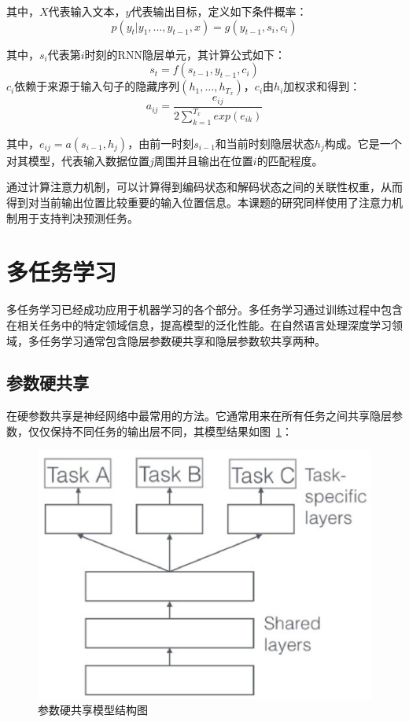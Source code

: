 其中，$X$代表输入文本，$y$代表输出目标，定义如下条件概率：
\begin{equation}
    p(y_t|y_1, \dots, y_{t-1},x) = g(y_{t-1},s_i,c_i)
\end{equation}

其中，$s_i$代表第$i$时刻的RNN隐层单元，其计算公式如下：
\begin{equation}
    s_t= f(s_{t-1},y_{t-1},c_i)
\end{equation}
$c_i$依赖于来源于输入句子的隐藏序列$(h_1,\dots,h_{T_x})$，$c_i$由$h_i$加权求和得到：
\begin{equation}
a_{ij} = \frac{e_{ij}}{2\sum_{k=1}^{T_x}exp(e_{ik})}
\end{equation}

其中，$e_{ij}=a(s_{i-1},h_j)$，由前一时刻$s_{i-1}$和当前时刻隐层状态$h_j$构成。它是一个对其模型，代表输入数据位置$j$周围并且输出在位置$i$的匹配程度。

通过计算注意力机制，可以计算得到编码状态和解码状态之间的关联性权重，从而得到对当前输出位置比较重要的输入位置信息。本课题的研究同样使用了注意力机制用于支持判决预测任务。

\section{多任务学习}

多任务学习已经成功应用于机器学习的各个部分。多任务学习通过训练过程中包含在相关任务中的特定领域信息，提高模型的泛化性能。在自然语言处理深度学习领域，多任务学习通常包含隐层参数硬共享和隐层参数软共享两种。

\subsection{参数硬共享}
在硬参数共享是神经网络中最常用的方法。它通常用来在所有任务之间共享隐层参数，仅仅保持不同任务的输出层不同，其模型结果如图~\ref{fig:hard_share}：

\begin{figure}[htb]
    \centering
    \includegraphics[scale=0.5, clip=true]{./sources/rel_hard_share.eps}
    \vspace{-10pt}
    \caption{\label{fig:hard_share} 参数硬共享模型结构图}
    \vspace{-5pt}
\end{figure}


